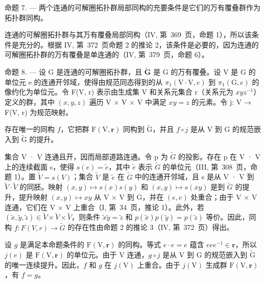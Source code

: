 命题 7. --- 两个连通的可解圈拓扑群局部同构的充要条件是它们的万有覆叠群作为拓扑群同构。

连通的可解圈拓扑群与其万有覆叠局部同构（IV, 第~369~页，命题 1），所以该条件是充分的。根据 IV, 第~372~页命题 2 的推论 2，该条件是必要的，因为连通的可解圈拓扑群的万有覆叠是单连通的（IV, 第~379~页，命题 6）。

命题 8. --- 设 G 是连通的可解圈拓扑群，且 \(\widetilde{\mathbf{G}}\) 是 G 的万有覆叠。设 V 是 G 的单位元 e 的连通开邻域，使得由规范同态得到的从 \(\pi_1(\mathrm{V} \cdot \mathrm{V}, e)\) 到 \(\pi_1(\mathrm{G}, e)\) 的像约化为单位元。令 F(V, r) 表示由生成集 V 和关系元集合 r（关系元为 \(xyz^{-1}\)）定义的群，其中 \((x, y, z)\) 遍历 V × V × V 中满足 \(xy = z\) 的元素。令 j: V → F(V, r) 为规范映射。

存在唯一的同构 \(f\)，它把群 \(\mathrm{F}(\mathrm{V},\mathbf{r})\) 同构到 \(\widetilde{\mathrm{G}}\)，并且 \(f \circ j\) 是从 V 到 G 的规范嵌入到 \(\widetilde{\mathrm{G}}\) 的提升。

集合 V · V 连通且开，因而局部道路连通。令 p 为 \(\widetilde{G}\) 的投影。存在 p 在 V · V 上的连续截面 s，使得 \(s(e) = \widetilde{e}\)，其中 \(\widetilde{e}\) 表示 \(\widetilde{G}\) 的单位元（III, 第~308~页，命题 1）。置 \(\widetilde{V} = s(V)\)；集合 \(\widetilde{V}\) 是 \(\widetilde{e}\) 在 \(\widetilde{G}\) 中的连通开邻域，且 s 是从 V · V 到 \(\widetilde{V} \cdot \widetilde{V}\) 的同胚。映射 \((x, y) \mapsto s(x)s(y)\) 和 \((x, y) \mapsto s(xy)\) 是到 \(\widetilde{G}\) 的提升，提升映射 \((x, y) \mapsto xy\) 从 V × V 到 G，并在 \((e, e)\) 处重合；由于 V × V 连通，它们在 V × V 上重合（I, 第~34~页，推论 1）。此外，若 \((\widetilde{x}, \widetilde{y}, \widetilde{z}) \in \widetilde{V} \times \widetilde{V} \times \widetilde{V}\)，则条件 \(\widetilde{x}\widetilde{y} = \widetilde{z}\) 和 \(p(\widetilde{x})p(\widetilde{y}) = p(\widetilde{z})\) 等价。因此，同构 \(f: F(V, r) \to \widetilde{G}\) 的存在性由命题 2 的推论 3（IV, 第~372~页）得出。

设 \(g\) 是满足本命题条件的 \(\mathrm{F}(\mathrm{V},\mathbf{r})\) 的同构。等式 \(e \cdot e = e\) 蕴含 \(eee^{-1} \in \mathbf{r}\)，所以 \(j(e)\) 是 \(\mathrm{F}(\mathrm{V},\mathbf{r})\) 的单位元。由于 V 连通，\(g \circ j\) 是从 V 到 G 的规范嵌入到 \(\widetilde{\mathrm{G}}\) 的唯一连续提升。因此，\(f\) 和 \(g\) 在 \(j(\mathrm{V})\) 上重合。由于 \(j(\mathrm{V})\) 生成群 \(\mathrm{F}(\mathrm{V},\mathbf{r})\)，有 \(f = g\)。

